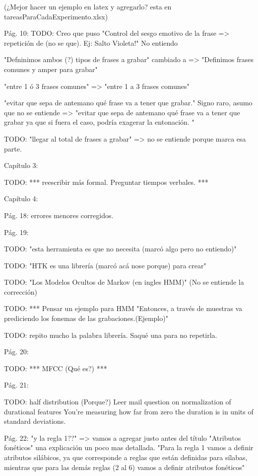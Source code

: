 (¿Mejor hacer un ejemplo en latex y agregarlo? esta en tareasParaCadaExperimento.xlsx) 

Pág. 10:
TODO: Creo que puso "Control del sesgo emotivo de la frase => repetición de (no se que). Ej: Salto Violeta!"
No entiendo

"Defninimos ambos (?) tipos de frases a grabar" cambiado a => "Definimos frases comunes y amper para grabar"

"entre 1 ó 3 frases comunes" => "entre 1 a 3 frases comunes"

"evitar que sepa de antemano qué frase va a tener que grabar." Signo raro, asumo que no se entiende => 
"evitar que sepa de antemano qué frase va a tener que grabar ya que si fuera el caso, podría exagerar la entonación. "

TODO: "llegar al total de frases a grabar" => no se entiende porque marca esa parte.

Capítulo 3: 

TODO: *** reescribir más formal. Preguntar tiempos verbales. ***

Capítulo 4:

Pág. 18: errores menores corregidos.

Pág. 19: 

TODO: "esta herramienta es que no necesita (marcó algo pero no entiendo)"

TODO: "HTK es una librería (marcó acá nose porque) para crear"

TODO: "Los Modelos Ocultos de Markov \cite{rabiner} (en ingles HMM)" (No se entiende la corrección)

TODO: *** Pensar un ejemplo para HMM
"Entonces, a través de muestras va prediciendo los fonemas de las grabaciones.(Ejemplo)"

TODO: repito mucho la palabra librería. Saqué una para no repetirla.


Pág. 20:

TODO: *** MFCC (Qué es?) ***

Pág. 21:

TODO: half distribution (Porque?) Leer mail question on normalization of durational features
You're measuring how far from zero the duration is in units of standard deviations.

Pág. 22:
"y la regla 1??" => vamos a agregar justo antes del título "Atributos fonéticos" una explicación un poco mas detallada. "Para la regla 1 vamos a definir atributos silábicos, ya que corresponde a reglas que están definidas para sílabas, mientras que para las demás reglas (2 al 6) vamos a definir atributos fonéticos"

